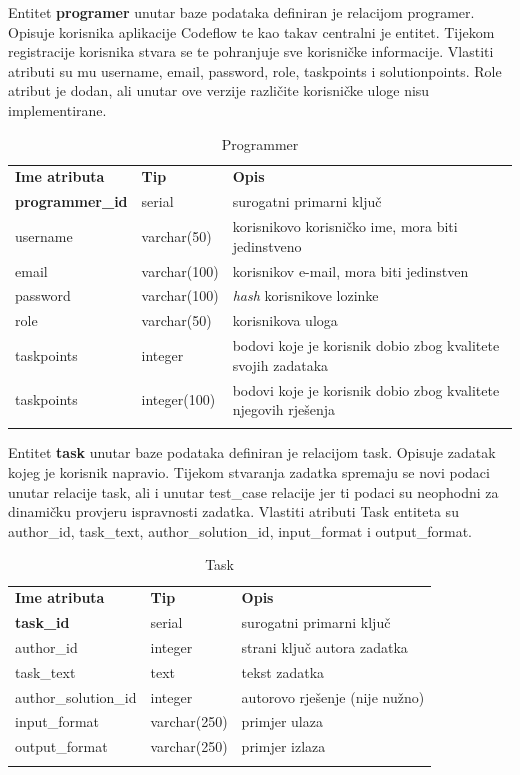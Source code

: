 \documentclass[times, utf8, zavrsni]{fer}
\begin{document}
		Entitet \textbf{programer} unutar baze podataka definiran je relacijom programer. Opisuje korisnika aplikacije Codeflow te kao takav centralni je entitet. Tijekom registracije korisnika stvara se te pohranjuje sve korisničke informacije. Vlastiti atributi su mu username, email, password, role, taskpoints i solutionpoints. Role atribut je dodan, ali unutar ove verzije različite korisničke uloge nisu implementirane.
		\begin{table}[H]
			\caption{Programmer}
			\label{tbl:programmer}
			\centering
			\begin{tabu} to \textwidth {XXX}
				\tabucline[1.75pt]{-}
				\textbf{Ime atributa} & \textbf{Tip} & \textbf{Opis}\\ 				
				\tabucline[1.75pt]{-}
				\textbf{programmer\_id} & serial & surogatni primarni ključ\\ \hline
				username & varchar(50) & korisnikovo korisničko ime, mora biti jedinstveno\\ \hline
				email & varchar(100) & korisnikov e-mail, mora biti jedinstven\\ \hline
				password & varchar(100) & \textit{hash} korisnikove lozinke\\ \hline
				role & varchar(50) & korisnikova uloga\\ \hline
				taskpoints & integer & bodovi koje je korisnik dobio zbog kvalitete svojih zadataka\\ \hline
				taskpoints & integer(100) &  bodovi koje je korisnik dobio zbog kvalitete njegovih rješenja\\
				\tabucline[1.75pt]{-}
			\end{tabu}
		\end{table}
		
		Entitet \textbf{task} unutar baze podataka definiran je relacijom task. Opisuje zadatak kojeg je korisnik napravio. Tijekom stvaranja zadatka spremaju se novi podaci unutar relacije task, ali i unutar test\_case relacije jer ti podaci su neophodni za dinamičku provjeru ispravnosti zadatka. Vlastiti atributi Task entiteta su author\_id, task\_text, author\_solution\_id, input\_format i output\_format.
		\begin{table}[H]
			\caption{Task}
			\label{tbl:task}
			\centering
			\begin{tabu} to \textwidth {XXX}
				\tabucline[1.75pt]{-}
				\textbf{Ime atributa} & \textbf{Tip} & \textbf{Opis}\\ 				
				\tabucline[1.75pt]{-}
				\textbf{task\_id} & serial & surogatni primarni ključ\\ \hline
				author\_id & integer & strani ključ autora zadatka\\ \hline
				task\_text & text & tekst zadatka\\ \hline
				author\_solution\_id & integer & autorovo rješenje (nije nužno)\\ \hline
				input\_format & varchar(250) & primjer ulaza\\ \hline
				output\_format & varchar(250) & primjer izlaza\\ \hline
				\tabucline[1.75pt]{-}
			\end{tabu}
		\end{table}
	
\end{document}
